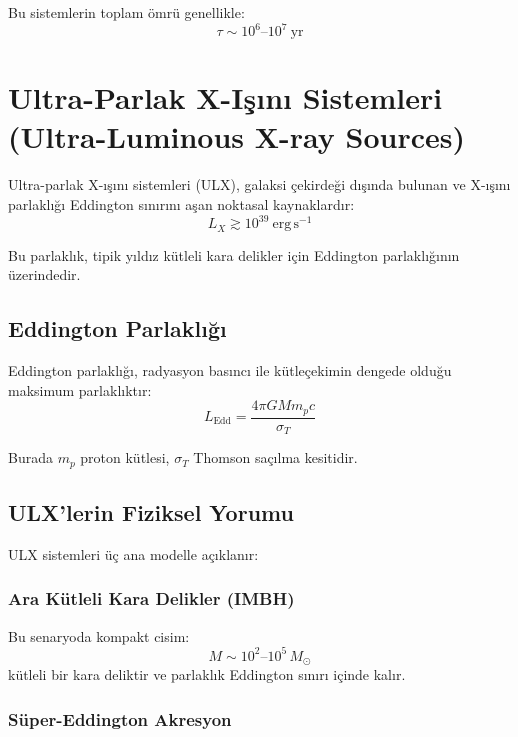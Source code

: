 Bu sistemlerin toplam ömrü genellikle:
\begin{equation}
\tau \sim 10^6\text{--}10^7\ \mathrm{yr}
\end{equation}

\section{Ultra-Parlak X-Işını Sistemleri (Ultra-Luminous X-ray Sources)}

Ultra-parlak X-ışını sistemleri (ULX), galaksi çekirdeği dışında bulunan ve X-ışını parlaklığı Eddington sınırını aşan noktasal kaynaklardır:
\begin{equation}
L_X \gtrsim 10^{39}\ \mathrm{erg\,s^{-1}}
\end{equation}

Bu parlaklık, tipik yıldız kütleli kara delikler için Eddington parlaklığının üzerindedir.

\subsection{Eddington Parlaklığı}

Eddington parlaklığı, radyasyon basıncı ile kütleçekimin dengede olduğu maksimum parlaklıktır:
\begin{equation}
L_{\mathrm{Edd}} = \frac{4\pi GMm_p c}{\sigma_T}
\end{equation}

Burada $m_p$ proton kütlesi, $\sigma_T$ Thomson saçılma kesitidir.

\subsection{ULX'lerin Fiziksel Yorumu}

ULX sistemleri üç ana modelle açıklanır:

\subsubsection{Ara Kütleli Kara Delikler (IMBH)}

Bu senaryoda kompakt cisim:
\begin{equation}
M \sim 10^2\text{--}10^5\,M_\odot
\end{equation}
kütleli bir kara deliktir ve parlaklık Eddington sınırı içinde kalır.

\subsubsection{Süper-Eddington Akresyon}

